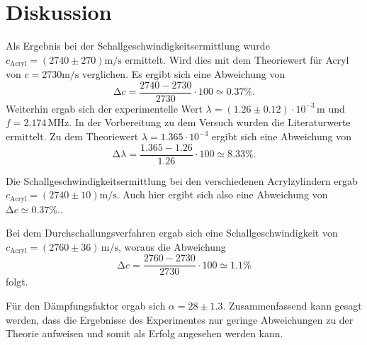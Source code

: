 \section{Diskussion}
\label{sec:Diskussion}
Als Ergebnis bei der Schallgeschwindigkeitsermittlung wurde $c_\text{Acryl} = (2740 \pm 270) \unit{\meter / \second}$ ermittelt.
Wird dies mit dem Theoriewert für Acryl von $c = 2730 \unit{\meter / \second}$ verglichen.
Es ergibt sich eine Abweichung von 
\begin{equation*}
    \increment c = \frac{2740  - 2730}{2730} \cdot 100 \simeq 0.37 \%.
\end{equation*}
Weiterhin ergab sich der experimentelle Wert $\lambda = (1.26 \pm 0.12) \cdot 10^{-3} \, \unit\meter$ und $f = 2.174 \, \unit{\mega\hertz}$.
In der Vorbereitung zu dem Versuch wurden die Literaturwerte ermittelt.
Zu dem Theoriewert $\lambda = 1.365 \cdot  10^{-3}$ ergibt sich eine Abweichung von 
\begin{equation*}
    \increment \lambda = \frac{1.365  - 1.26}{1.26} \cdot 100 \simeq 8.33 \%.
\end{equation*}

Die Schallgeschwindigkeitsermittlung bei den verschiedenen Acrylzylindern ergab $c_\text{Acryl} = (2740 \pm 10) \unit{\meter / \second}$.
Auch hier ergibt sich also eine Abweichung von $\increment c \simeq 0.37 \%.$.

Bei dem Durchschallungsverfahren ergab sich eine Schallgeschwindigkeit von $c_\text{Acryl} = (2760 \pm 36)  \, \unit{\meter / \second}$,
woraus die Abweichung 
\begin{equation*}
    \increment c = \frac{2760  - 2730}{2730} \cdot 100 \simeq 1.1 \%
\end{equation*}
folgt.

Für den Dämpfungsfaktor ergab sich $\alpha = 28 \pm 1.3$.
Zusammenfassend kann gesagt werden, dass die Ergebnisse des Experimentes nur geringe Abweichungen zu der Theorie aufweisen und somit als Erfolg angesehen werden kann.